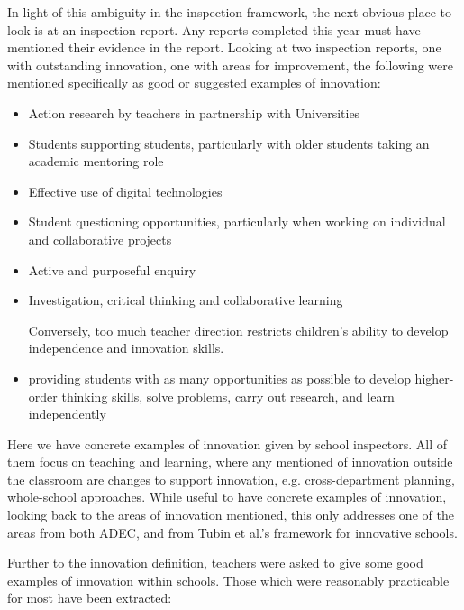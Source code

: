 In light of this ambiguity in the inspection framework, the next obvious place to look is at an inspection report. Any reports completed this year must have mentioned their evidence in the report. Looking at two inspection reports, one with outstanding innovation, one with areas for improvement, the following were mentioned specifically as good or suggested examples of innovation:
\begin{itemize}
\item Action research by teachers in partnership with Universities
\item Students supporting students, particularly with older students taking an academic mentoring role
\item Effective use of digital technologies
\item Student questioning opportunities, particularly when working on individual and collaborative projects
\item Active and purposeful enquiry 
\item Investigation, critical thinking and collaborative learning
\item [Conversely,] too much teacher direction restricts children’s ability to develop independence and innovation skills.
\item providing students with as many opportunities as possible to develop higher-order thinking skills, solve problems, carry out research, and learn independently
\end{itemize}

Here we have concrete examples of innovation given by school inspectors. All of them focus on teaching and learning, where any mentioned of innovation outside the classroom are changes to support innovation, e.g. cross-department planning, whole-school approaches. While useful to have concrete examples of innovation, looking back to the areas of innovation mentioned, this only addresses one of the areas from both ADEC, and from Tubin et al.'s framework for innovative schools.

Further to the innovation definition, teachers were asked to give some good examples of innovation within schools. Those which were reasonably practicable for most have been extracted: 

